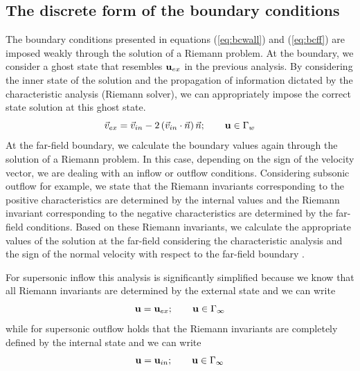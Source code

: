 \documentclass[review]{elsarticle}
\begin{document}
\subsection{The discrete form of the boundary conditions}
The boundary conditions presented in equations (\ref{eq:bcwall}) and (\ref{eq:bcff}) are imposed weakly through the solution of a Riemann problem.
At the boundary, we consider a ghost state that resembles ${\bf u}_{ex}$ in the previous analysis. 
By considering the inner state of the solution and the propagation of information dictated by the characteristic analysis (Riemann solver), we can appropriately impose the correct state solution at this ghost state.
\begin{equation}\label{eq:ghost_slip_1}
\vec{v}_{ex} = \vec{v}_{in}-2\left(\vec{v}_{in}\cdot\vec{n}\right)\vec{n}; \qquad {{\bf u}}\in \Gamma_w
\end{equation}
At the far-field boundary, we calculate the boundary values again through the solution of a Riemann problem. In this case, depending on the sign of the velocity vector, we are dealing with an inflow or outflow conditions. Considering subsonic outflow for example, we state that the Riemann invariants corresponding to the positive characteristics are determined by the internal values and the Riemann invariant corresponding to the negative characteristics are determined by the far-field conditions. Based on these Riemann invariants, we calculate the appropriate values of the solution at the far-field considering the characteristic analysis and the sign of the normal velocity with respect to the far-field boundary \cite{ToroRiemann}.
\par For supersonic inflow this analysis is significantly simplified because we know that all Riemann invariants are determined by the external state and we can write
\begin{equation}
{\bf u} = {\bf u}_{ex};\qquad {{\bf u}}\in \Gamma_\infty
\end{equation}
while for supersonic outflow holds that the Riemann invariants are completely defined by the internal state and we can write
\begin{equation}
{\bf u} = {\bf u}_{in};\qquad {{\bf u}}\in \Gamma_\infty
\end{equation}
\end{document}
